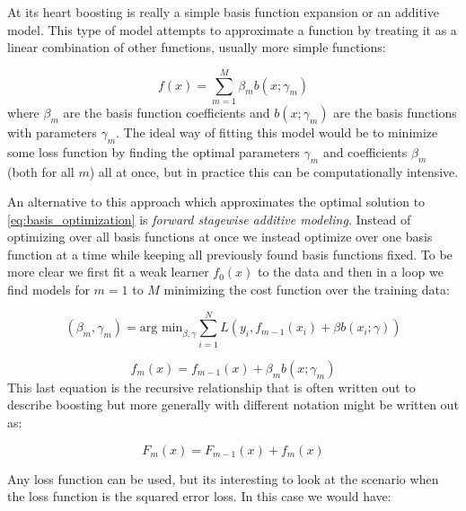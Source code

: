 At its heart boosting is really a simple basis function expansion or an additive model. This type of model attempts to approximate a function by treating it as a linear combination of other functions, usually more simple functions:

\begin{equation} \label{eq:basis_optimization}
f(x) = \sum^{M}_{m=1} {\beta_m b(x; \gamma_m)}
\end{equation}
where $\beta_m$ are the basis function coefficients and $b(x; \gamma_m)$ are the basis functions with parameters $\gamma_m$. 
The ideal way of fitting this model would be to minimize some loss function by finding the optimal parameters $\gamma_m$ and coefficients $\beta_m$ (both for all $m$) all at once, but in practice this can be computationally intensive. 

An alternative to this approach which approximates the optimal solution to \ref{eq:basis_optimization} is \emph{forward stagewise additive modeling}. Instead of optimizing over all basis functions at once we instead optimize over one basis function at a time while keeping all previously found basis functions fixed. To be more clear we first fit a weak learner $f_0(x)$ to the data and then in a loop we find models for $m=1$ to $M$ minimizing the cost function over the training data:

\begin{equation}
(\beta_m, \gamma_m) = \text{arg min}_{\beta, \gamma} \sum_{i=1}^{N}{L(y_i, f_{m-1}(x_i) + \beta b(x_i;\gamma))}
\end{equation}

\begin{equation}
f_m(x) = f_{m-1}(x) + \beta_m b(x;\gamma_m)
\end{equation}
This last equation is the recursive relationship that is often written out to describe boosting but more generally with different notation might be written out as:

\begin{equation} \label{eq:recursive}
F_m(x) = F_{m-1}(x) + f_m(x)
\end{equation}

Any loss function can be used, but its interesting to look at the scenario when the loss function is the squared error loss. In this case we would have:

